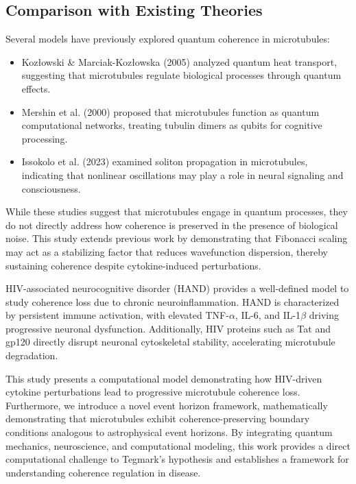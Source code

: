 \subsection{Comparison with Existing Theories}
Several models have previously explored quantum coherence in microtubules:
\begin{itemize}
\item Kozłowski \& Marciak-Kozłowska (2005) analyzed quantum heat transport, suggesting that microtubules regulate biological processes through quantum effects.
\item Mershin et al. (2000) proposed that microtubules function as quantum computational networks, treating tubulin dimers as qubits for cognitive processing.
\item Issokolo et al. (2023) examined soliton propagation in microtubules, indicating that nonlinear oscillations may play a role in neural signaling and consciousness.
\end{itemize}
While these studies suggest that microtubules engage in quantum processes, they do not directly address how coherence is preserved in the presence of biological noise. This study extends previous work by demonstrating that Fibonacci scaling may act as a stabilizing factor that reduces wavefunction dispersion, thereby sustaining coherence despite cytokine-induced perturbations.

HIV-associated neurocognitive disorder (HAND) provides a well-defined model to study coherence loss due to chronic neuroinflammation. HAND is characterized by persistent immune activation, with elevated TNF-$\alpha$, IL-6, and IL-1$\beta$ driving progressive neuronal dysfunction. Additionally, HIV proteins such as Tat and gp120 directly disrupt neuronal cytoskeletal stability, accelerating microtubule degradation.

This study presents a computational model demonstrating how HIV-driven cytokine perturbations lead to progressive microtubule coherence loss. Furthermore, we introduce a novel event horizon framework, mathematically demonstrating that microtubules exhibit coherence-preserving boundary conditions analogous to astrophysical event horizons. By integrating quantum mechanics, neuroscience, and computational modeling, this work provides a direct computational challenge to Tegmark’s hypothesis and establishes a framework for understanding coherence regulation in disease.